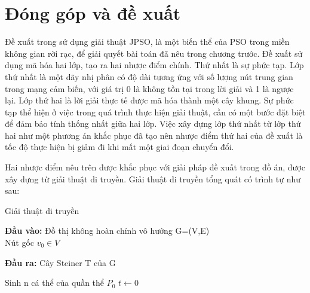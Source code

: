 \chapter{Đóng góp và đề xuất}
Đề xuất trong \cite{lu2014construction} sử dụng giải thuật JPSO, là một biến thể của PSO trong miền không gian rời rạc, để giải quyết bài toán đã nêu trong chương trước. Đề xuất sử dụng mã hóa hai lớp, tạo ra hai nhược điểm chính. Thứ nhất là sự phức tạp. Lớp thứ nhất là một dãy nhị phân có độ dài tương ứng với số lượng nút trung gian trong mạng cảm biến, với giá trị 0 là không tồn tại trong lời giải và 1 là ngược lại. Lớp thứ hai là lời giải thực tế được mã hóa thành một cây khung. Sự phức tạp thể hiện ở việc trong quá trình thực hiện giải thuật, cần có một bước đặt biệt để đảm bảo tính thống nhất giữa hai lớp. Việc xây dựng lớp thứ nhất từ lớp thứ hai như một phương án khắc phục đã tạo nên nhược điểm thứ hai của đề xuất là tốc độ thực hiện bị giảm đi khi mất một giai đoạn chuyển đổi.


Hai nhược điểm nêu trên được khắc phục với giải pháp đề xuất trong đồ án, được xây dựng từ giải thuật di truyền. Giải thuật di truyền tổng quát có trình tự như sau:

\begin{algorithm}[bth]
\caption{Giải thuật di truyền}\label{euclid}
\begin{algorithmic}[1]
	\State \textbf{Đầu vào: }Đồ thị không hoàn chỉnh vô hướng G=(V,E) \\
	Nút gốc $v_0 \in V$
		
	\State \textbf{Đầu ra: } Cây Steiner T của G 
	
	\State Sinh n cá thể của quần thể $P_0$
	\EndFor
	$t\leftarrow 0$\\
	\EndWhile
\EndProcedure
\end{algorithmic}
\end{algorithm}

